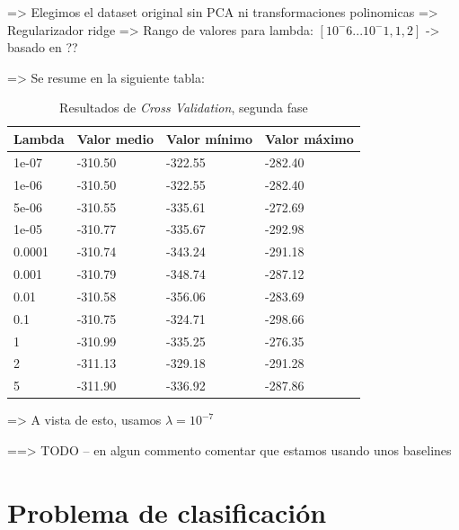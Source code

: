 \documentclass[11pt]{article}
\begin{document}
=> Elegimos el dataset original sin PCA ni transformaciones polinomicas
=> Regularizador ridge
=> Rango de valores para lambda: $[10^-6 ... 10^-1, 1, 2]$ -> basado en ??

=> Se resume en la siguiente tabla:

\begin{table}[H]
\begin{tabularx}{\textwidth}{|X|X|X|X|}
    \hline
    \textbf{Lambda} & \textbf{Valor medio} & \textbf{Valor mínimo} & \textbf{Valor máximo} \\
    \hline
    1e-07 & -310.50 &  -322.55 & -282.40 \\
    1e-06 & -310.50 &  -322.55 & -282.40 \\
    5e-06 & -310.55 &  -335.61 & -272.69 \\
    1e-05 & -310.77 &  -335.67 & -292.98 \\
    0.0001 & -310.74 &  -343.24 & -291.18 \\
    0.001 & -310.79 &  -348.74 & -287.12 \\
    0.01 & -310.58 &  -356.06 & -283.69 \\
    0.1 & -310.75 &  -324.71 & -298.66 \\
    1 & -310.99 &  -335.25 & -276.35 \\
    2 & -311.13 &  -329.18 & -291.28 \\
    5 & -311.90 &  -336.92 & -287.86 \\
    \hline
\end{tabularx}
    \caption{Resultados de \emph{Cross Validation}, segunda fase}
\end{table}

=> A vista de esto, usamos $\lambda = 10^{-7}$


==> TODO -- en algun commento comentar que estamos usando unos baselines
\pagebreak
\section{Problema de clasificación}

\pagebreak



\end{document}
